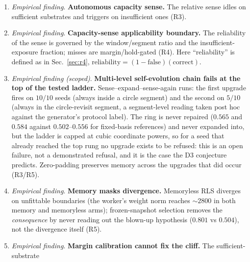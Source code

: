\documentclass[preprint,12pt]{elsarticle}
\begin{document}
\begin{enumerate}[label=\arabic*.]
win). In the implemented policy a slot is evicted only when the capacity is
reached, never on elapsed time, but no time-driven control arm was run, so the
rule is described rather than contrasted (R3/R5). Against the external EWC
baseline at a matched optimiser (\texttt{s65\_ewc\_baseline.py}), whole-run
accuracy falls ($-0.85\pm0.70$\,pp, $t=-3.87$, $0/10$) and total revisit
retention is unchanged ($-0.60\pm2.02$\,pp, $t=-0.94$, n.s.); EWC
\emph{redistributes} retention (circle revisit $+4.95\pm4.28$\,pp, linear
revisit $-6.15\pm3.72$\,pp), whereas the frozen-snapshot arm gains
$+8.70\pm2.92$\,pp of retention with no linear-revisit loss.
\item \emph{Empirical finding}. \textbf{Autonomous capacity sense.} The relative sense idles on
sufficient substrates and triggers on insufficient ones (R3).
\item \emph{Empirical finding}. \textbf{Capacity-sense applicability boundary.} The reliability of
the sense is governed by the window/segment ratio and the
insufficient-exposure fraction; misses are margin/hold-gated (R4). Here
``reliability'' is defined as in Sec.~\ref{sec:r4},
$\text{reliability}=(1-\text{false})(\text{correct})$.
\item \emph{Empirical finding (scoped)}. \textbf{Multi-level self-evolution chain fails at the top of the tested ladder.} Sense--expand--sense-again
runs: the first upgrade fires on $10/10$ seeds (always inside a circle
segment) and the second on $5/10$ (always in the circle-revisit segment, a
segment-level reading taken post hoc against the generator's protocol label).
The ring is never repaired ($0.565$ and $0.584$ against $0.502$--$0.556$ for
fixed-basis references) and never expanded into, but the ladder is capped at
cubic coordinate powers, so for a seed that already reached the top rung no
upgrade exists to be refused: this is an open failure, not a demonstrated
refusal, and it is the case the D3 conjecture predicts. Zero-padding preserves
memory across the upgrades that did occur (R3/R5).
\item \emph{Empirical finding}. \textbf{Memory masks divergence.} Memoryless RLS diverges on
unfittable boundaries (the worker's weight norm reaches $\sim2800$ in both
memory and memoryless arms); frozen-snapshot selection removes the
\emph{consequence} by never reading out the blown-up hypothesis
($0.801$ vs $0.504$), not the divergence itself (R5).
\item \emph{Empirical finding}. \textbf{Margin calibration cannot fix the cliff.} The sufficient-substrate

\end{enumerate}
\end{document}
